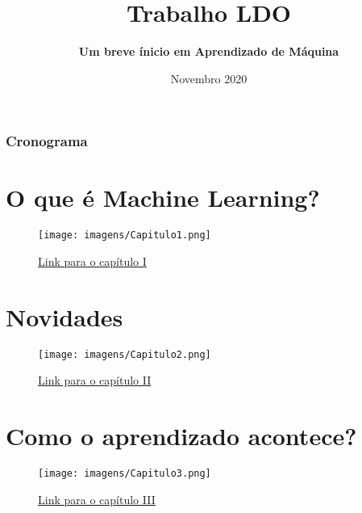 \documentclass{beamer}
\title[LDO] %
{\textbf{Trabalho LDO}}
\subtitle{\textbf{Um breve ínicio em Aprendizado de Máquina}}
\institute[PUC] %
{
  \inst{1}%
  \emph{Pontifícia Universidade Católica de Minas Gerais}
  \\PUC-MG
}
\date[2020] %
{Novembro 2020}
\begin{document}
\frame{\titlepage}


\begin{frame}
    \frametitle{Cronograma}
    \tableofcontents
\end{frame}

\section{O que é Machine Learning?}

\begin{frame}

    \begin{figure}[ht]
        \centering
        \texttt{[image: imagens/Capitulo1.png]}
        \caption{\href{run:./capitulos/Capitulo1.pdf}{Link para o capítulo I}}
    \end{figure}

\end{frame}

\section{Novidades}

\begin{frame}

    \begin{figure}[ht]
        \centering
        \texttt{[image: imagens/Capitulo2.png]}
        \caption{\href{run:./capitulos/Capitulo2.pdf}{Link para o capítulo II}}
    \end{figure}

\end{frame}

\section{Como o aprendizado acontece?}

\begin{frame}

    \begin{figure}[ht]
        \centering
        \texttt{[image: imagens/Capitulo3.png]}
        \caption{\href{run:./capitulos/Capitulo3.pdf}{Link para o capítulo III}}
    \end{figure}

\end{frame}
\end{document}
